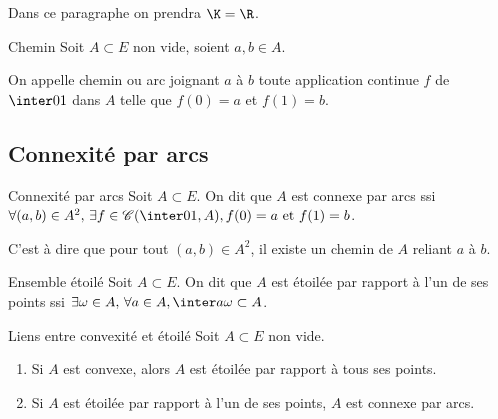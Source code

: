 Dans ce paragraphe on prendra $\K = \R$.

\begin{definition}{Chemin}{}
    Soit $A \subset E$ non vide, soient $a, b \in A$. 

    On appelle chemin ou arc joignant $a$ à $b$ toute application continue $f$ de 
    $\inter 0 1$ dans $A$ telle que $f(0) = a$ et $f(1) = b$.
\end{definition}


\subsection{Connexité par arcs}

\begin{definition}{Connexité par arcs}{}
    Soit $A \subset E$. 
    On dit que $A$ est connexe par arcs ssi $\forall (a, b) \in A^2, \, \exists f \in \mathscr C(\inter 0 1, A), f(0) = a \text{ et } f(1) = b$. 

    C'est à dire que pour tout $(a, b) \in A^2$, il existe un chemin de $A$ reliant $a$ à $b$.
\end{definition}


\begin{definition}{Ensemble étoilé}{}
    Soit $A \subset E$.
    On dit que $A$ est étoilée par rapport à l'un de ses points ssi $\exists \omega \in A, 
    \, \forall a \in A, \inter a \omega \subset A$.
\end{definition}

\begin{proposition}{Liens entre convexité et étoilé}{}
    Soit $A \subset E$ non vide. 
    \begin{enumerate}
        \item Si $A$ est convexe, alors $A$ est étoilée par rapport à tous ses points. 
        \item Si $A$ est étoilée par rapport à l'un de ses points, $A$ est connexe par arcs. 
    \end{enumerate}
\end{proposition}


